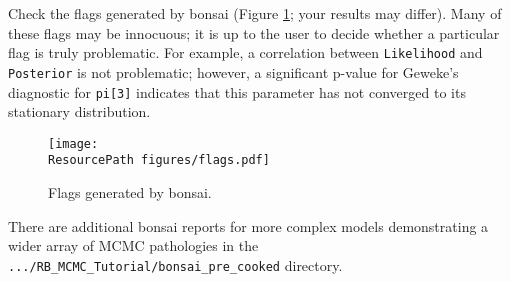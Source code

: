 Check the flags generated by bonsai (Figure \ref{fig:flags}; your results may differ). 
Many of these flags may be innocuous; it is up to the user to decide whether a particular flag is truly problematic.
For example, a correlation between \texttt{Likelihood} and \texttt{Posterior} is not problematic; however, a significant p-value for Geweke's diagnostic for \texttt{pi[3]} indicates that this parameter has not converged to its stationary distribution.

\begin{figure}[h!]
\begin{center}
\texttt{[image: \\ResourcePath figures/flags.pdf]}
\end{center}
\caption{Flags generated by bonsai.}\label{fig:flags}
\end{figure}

There are additional bonsai reports for more complex models demonstrating a wider array of MCMC pathologies in the \verb!.../RB_MCMC_Tutorial/bonsai_pre_cooked! directory.




